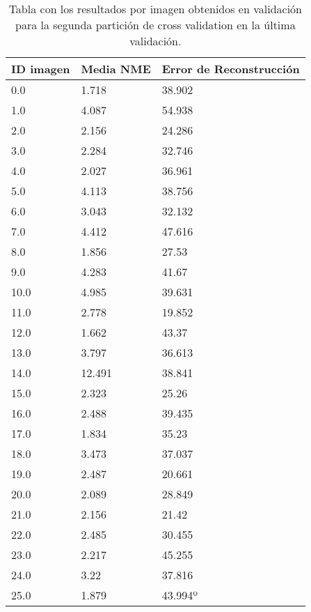 \begin{table}[!ht]
    \centering
    \caption{Tabla con los resultados por imagen obtenidos en validación para la segunda partición de cross validation en la última validación.}
    \begin{tabular}{|l|l|l|}
    \hline
        ID imagen & Media NME & Error de Reconstrucción \\ \hline
        0.0 & 1.718 & 38.902 \\ \hline
        1.0 & 4.087 & 54.938 \\ \hline
        2.0 & 2.156 & 24.286 \\ \hline
        3.0 & 2.284 & 32.746 \\ \hline
        4.0 & 2.027 & 36.961 \\ \hline
        5.0 & 4.113 & 38.756 \\ \hline
        6.0 & 3.043 & 32.132 \\ \hline
        7.0 & 4.412 & 47.616 \\ \hline
        8.0 & 1.856 & 27.53 \\ \hline
        9.0 & 4.283 & 41.67 \\ \hline
        10.0 & 4.985 & 39.631 \\ \hline
        11.0 & 2.778 & 19.852 \\ \hline
        12.0 & 1.662 & 43.37 \\ \hline
        13.0 & 3.797 & 36.613 \\ \hline
        14.0 & 12.491 & 38.841 \\ \hline
        15.0 & 2.323 & 25.26 \\ \hline
        16.0 & 2.488 & 39.435 \\ \hline
        17.0 & 1.834 & 35.23 \\ \hline
        18.0 & 3.473 & 37.037 \\ \hline
        19.0 & 2.487 & 20.661 \\ \hline
        20.0 & 2.089 & 28.849 \\ \hline
        21.0 & 2.156 & 21.42 \\ \hline
        22.0 & 2.485 & 30.455 \\ \hline
        23.0 & 2.217 & 45.255 \\ \hline
        24.0 & 3.22 & 37.816 \\ \hline
        25.0 & 1.879 & 43.994º \\ \hline
    \end{tabular}
    \label{table::ModelBase_Partition2}
\end{table}



